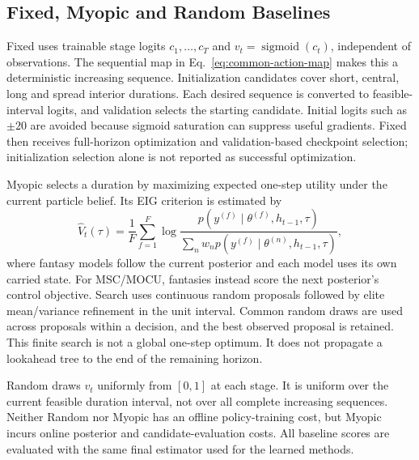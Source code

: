 \documentclass[journal]{IEEEtran}
\begin{document}
\subsection{Fixed, Myopic and Random Baselines}
Fixed uses trainable stage logits $c_1,\ldots,c_T$ and
$v_t=\operatorname{sigmoid}(c_t)$, independent of observations. The sequential
map in Eq.~\eqref{eq:common-action-map} makes this a deterministic increasing
sequence. Initialization candidates cover short, central, long and spread
interior durations. Each desired sequence is converted to feasible-interval
logits, and validation selects the starting candidate. Initial logits such as
$\pm20$ are avoided because sigmoid saturation can suppress useful gradients.
Fixed then receives full-horizon optimization and validation-based checkpoint
selection; initialization selection alone is not reported as successful
optimization.

Myopic selects a duration by maximizing expected one-step utility under the
current particle belief. Its EIG criterion is estimated by
\begin{equation}
\widehat V_t(\tau)=\frac{1}{F}\sum_{f=1}^{F}
\log\frac{p(y^{(f)}\mid\theta^{(f)},h_{t-1},\tau)}
{\sum_n w_n p(y^{(f)}\mid\theta^{(n)},h_{t-1},\tau)},
\label{eq:myopic-utility}
\end{equation}
where fantasy models follow the current posterior and each model uses its
own carried state. For MSC/MOCU, fantasies instead score the next posterior's
control objective. Search uses continuous random proposals followed by elite
mean/variance refinement in the unit interval. Common random draws are used
across proposals within a decision, and the best observed proposal is retained.
This finite search is not a global one-step optimum. It does not propagate a
lookahead tree to the end of the remaining horizon.

Random draws $v_t$ uniformly from $[0,1]$ at each stage. It is uniform over the
current feasible duration interval, not over all complete increasing sequences.
Neither Random nor Myopic has an offline policy-training cost, but Myopic
incurs online posterior and candidate-evaluation costs. All baseline scores
are evaluated with the same final estimator used for the learned methods.
\end{document}
